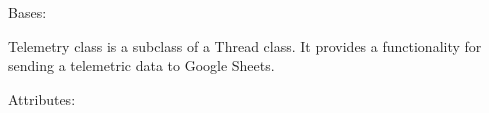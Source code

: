 \documentclass[letterpaper,10pt,english,openany]{sphinxmanual}
\begin{document}

\begin{fulllineitems}
\label{rpicameramon:rpicameramon.telemetry.TelemetrySender}
Bases: 

Telemetry class is a subclass of a Thread class.
It provides a functionality for sending a telemetric data to
Google Sheets.

Attributes:

\begin{fulllineitems}
\label{rpicameramon:rpicameramon.telemetry.TelemetrySender.run}
\end{fulllineitems}


\begin{fulllineitems}
\label{rpicameramon:rpicameramon.telemetry.TelemetrySender.getTelemetry}
\end{fulllineitems}


\end{fulllineitems}




\renewcommand{\indexname}{Index}
\printindex
\end{document}
